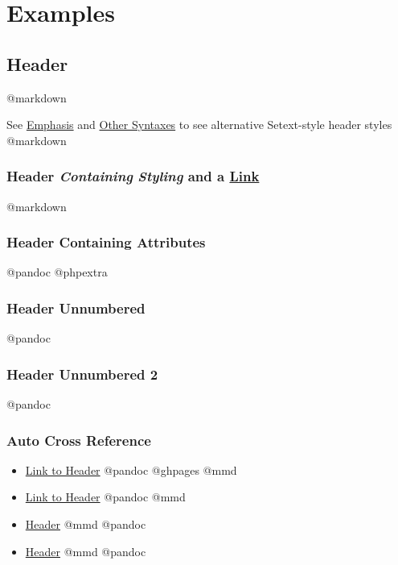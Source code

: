 \documentclass[]{article}
\providecommand{\tightlist}{%
  \setlength{\itemsep}{0pt}\setlength{\parskip}{0pt}}
\begin{document}
\hypertarget{examples}{\section{Examples}\label{examples}}

\hypertarget{header}{\subsection{Header}\label{header}}

@markdown

See \protect\hyperlink{emphasis}{Emphasis} and
\protect\hyperlink{other-syntaxes}{Other Syntaxes} to see alternative
Setext-style header styles @markdown

\subsubsection{\texorpdfstring{Header \emph{Containing}
\textbf{\emph{Styling}} and a
\href{Https://www.wikipedia.org/}{Link}}{Header Containing Styling and a Link}}\label{header-containing-styling-and-a-link}

@markdown

\hypertarget{identifier}{\subsubsection{Header Containing
Attributes}\label{identifier}}

@pandoc @phpextra

\subsubsection*{Header Unnumbered}\label{header-unnumbered}

@pandoc

\subsubsection{Header Unnumbered 2}\label{header-unnumbered-2}

@pandoc

\subsubsection{Auto Cross Reference}\label{auto-cross-reference}

\begin{itemize}
\tightlist
\item
  \protect\hyperlink{header}{Link to Header} @pandoc @ghpages @mmd
\item
  \protect\hyperlink{header}{Link to Header} @pandoc @mmd
\item
  \protect\hyperlink{header}{Header} @mmd @pandoc
\item
  \protect\hyperlink{header}{Header} @mmd @pandoc
\end{itemize}
\end{document}
